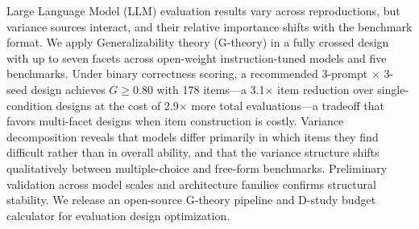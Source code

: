 Large Language Model (LLM) evaluation results vary across reproductions, but variance sources interact, and their relative importance shifts with the benchmark format. We apply Generalizability theory (G-theory) in a fully crossed design with up to seven facets across open-weight instruction-tuned models and five benchmarks. Under binary correctness scoring, a recommended 3-prompt $\times$ 3-seed design achieves $G \geq 0.80$ with 178 items---a 3.1$\times$ item reduction over single-condition designs at the cost of 2.9$\times$ more total evaluations---a tradeoff that favors multi-facet designs when item construction is costly. Variance decomposition reveals that models differ primarily in which items they find difficult rather than in overall ability, and that the variance structure shifts qualitatively between multiple-choice and free-form benchmarks. Preliminary validation across model scales and architecture families confirms structural stability. We release an open-source G-theory pipeline and D-study budget calculator for evaluation design optimization.
